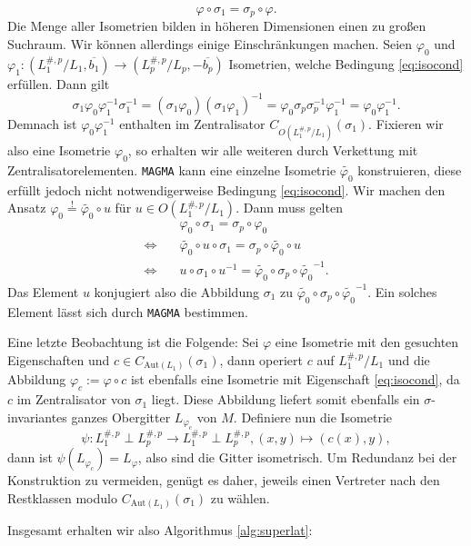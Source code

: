 \documentclass[12pt,a4paper,halfparskip,headsepline,bibtotocnumbered]{scrreprt}
\theoremstyle{nummermitklammern}
\theoremstyle{nonumberbreak}
\begin{document}
\begin{equation}\label{eq:isocond}
\varphi \circ \sigma_1 = \sigma_p \circ \varphi.
\end{equation}
Die Menge aller Isometrien bilden in höheren Dimensionen einen zu großen Suchraum. Wir können allerdings einige Einschränkungen machen. Seien $\varphi_0$ und $\varphi_1 : (L_1^{\#,p} / L_1, \overline{b_1}) \rightarrow (L_p^{\#,p} / L_p, -\overline{b_p})$ Isometrien, welche Bedingung \eqref{eq:isocond} erfüllen. Dann gilt
\begin{equation*}
	\sigma_1 \varphi_0 \varphi_1^{-1} \sigma_1^{-1} = (\sigma_1 \varphi_0) (\sigma_1 \varphi_1)^{-1} = \varphi_0 \sigma_p \sigma_p^{-1} \varphi_1^{-1} = \varphi_0 \varphi_1^{-1}.
\end{equation*}
Demnach ist $\varphi_0 \varphi_1^{-1}$ enthalten im Zentralisator $C_{O(L_1^{\#,p} / L_1)}(\sigma_1)$. Fixieren wir also eine Isometrie $\varphi_0$, so erhalten wir alle weiteren durch Verkettung mit Zentralisatorelementen. \texttt{MAGMA} kann eine einzelne Isometrie $\tilde{\varphi_0}$ konstruieren, diese erfüllt jedoch nicht notwendigerweise Bedingung \eqref{eq:isocond}. Wir machen den Ansatz $\varphi_0 \stackrel{!}{=} \tilde{\varphi_0} \circ u$ für $u \in O(L_1^{\#,p}/L_1)$. Dann muss gelten
\begin{align*}
	&\quad\varphi_0 \circ \sigma_1 = \sigma_p \circ \varphi_0\\
	\Leftrightarrow& \quad\tilde{\varphi_0} \circ u \circ \sigma_1 = \sigma_p \circ \tilde{\varphi_0} \circ u \\
	\Leftrightarrow& \quad u \circ \sigma_1 \circ u^{-1} = \tilde{\varphi_0} \circ \sigma_p \circ \tilde{\varphi_0}^{-1}.
\end{align*}
Das Element $u$ konjugiert also die Abbildung $\sigma_1$ zu $\tilde{\varphi_0} \circ \sigma_p \circ \tilde{\varphi_0}^{-1}$. Ein solches Element lässt sich durch \texttt{MAGMA} bestimmen.\par
Eine letzte Beobachtung ist die Folgende: Sei $\varphi$ eine Isometrie mit den gesuchten Eigenschaften und $c \in C_{\text{Aut}(L_1)}(\sigma_1)$, dann operiert $c$ auf $L_1^{\#,p} / L_1$ und die Abbildung $\varphi_c := \varphi \circ c$ ist ebenfalls eine Isometrie mit Eigenschaft \eqref{eq:isocond}, da $c$ im Zentralisator von $\sigma_1$ liegt. Diese Abbildung liefert somit ebenfalls ein $\sigma$-invariantes ganzes Obergitter $L_{\varphi_c}$ von $M$. Definiere nun die Isometrie
\begin{equation*}
	\psi : L_1^{\#,p} \perp L_p^{\#,p} \rightarrow L_1^{\#,p} \perp L_p^{\#,p}, (x, y) \mapsto ( c(x), y),
\end{equation*}
dann ist $\psi(L_{\varphi_c}) = L_\varphi$, also sind die Gitter isometrisch. Um Redundanz bei der Konstruktion zu vermeiden, genügt es daher, jeweils einen Vertreter nach den Restklassen modulo $C_{\text{Aut}(L_1)}(\sigma_1)$ zu wählen.\par
Insgesamt erhalten wir also Algorithmus \eqref{alg:superlat}:
\end{document}
